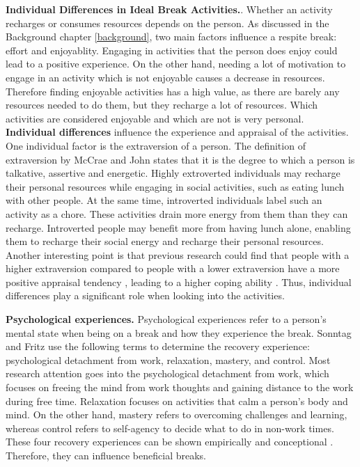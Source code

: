 \documentclass{hasel_thesis}
\begin{document}
\textbf{Individual Differences in Ideal Break Activities.}. Whether an activity recharges or consumes resources depends on the person.
As discussed in the Background chapter \ref{background}, two main factors influence a respite break: effort and enjoyablity\cite{Trougakos.2009}. Engaging in activities that the person does enjoy could lead to a positive experience. On the other hand, needing a lot of motivation to engage in an activity which is not enjoyable causes a decrease in resources. Therefore finding enjoyable activities has a high value, as there are barely any resources needed to do them, but they recharge a lot of resources. Which activities are considered enjoyable and which are not is very personal.
\textbf{Individual differences} influence the experience and appraisal of the activities. One individual factor is the extraversion of a person. The definition of extraversion by McCrae and John \cite{McCrae.1992} states that it is the degree to which a person is talkative, assertive and energetic. Highly extroverted individuals may recharge their personal resources while engaging in social activities, such as eating lunch with other people. At the same time, introverted individuals label such an activity as a chore. These activities drain more energy from them than they can recharge. Introverted people may benefit more from having lunch alone, enabling them to recharge their social energy and recharge their personal resources. Another interesting point is that previous research could find that people with a higher extraversion compared to people with a lower extraversion have a more positive appraisal tendency \cite{Gallagher.1990, Hemenover.1996}, leading to a higher coping ability \cite{Penley.2002}. Thus, individual differences play a significant role when looking into the activities.


\textbf{Psychological experiences.} Psychological experiences refer to a person's mental state when being on a break and how they experience the break. Sonntag and Fritz \cite{Sonnentag.2017} use the following terms to determine the recovery experience: psychological detachment from work, relaxation, mastery, and control. Most research attention goes into the psychological detachment from work, which focuses on freeing the mind from work thoughts and gaining distance to the work during free time. Relaxation focuses on activities that calm a person's body and mind. On the other hand, mastery refers to overcoming challenges and learning, whereas control refers to self-agency to decide what to do in non-work times. These four recovery experiences can be shown empirically and conceptional \cite{sonnentag.2007}. Therefore, they can influence beneficial breaks.
\end{document}
